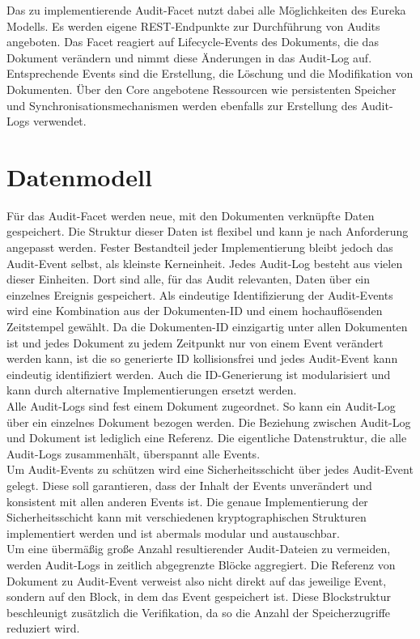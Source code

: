 Das zu implementierende Audit-Facet nutzt dabei alle Möglichkeiten des Eureka Modells. Es werden eigene \acs{REST}-Endpunkte zur Durchführung von Audits angeboten. Das Facet reagiert auf Lifecycle-Events des Dokuments, die das Dokument verändern und nimmt diese Änderungen in das Audit-Log auf. Entsprechende Events sind die Erstellung, die Löschung und die Modifikation von Dokumenten. Über den Core angebotene Ressourcen wie persistenten Speicher und Synchronisationsmechanismen werden ebenfalls zur Erstellung des Audit-Logs verwendet.

\section{Datenmodell}

Für das Audit-Facet werden neue, mit den Dokumenten verknüpfte Daten gespeichert. Die Struktur dieser Daten ist flexibel und kann je nach Anforderung angepasst werden. Fester Bestandteil jeder Implementierung bleibt jedoch das Audit-Event selbst, als kleinste Kerneinheit. Jedes Audit-Log besteht aus vielen dieser Einheiten. Dort sind alle, für das Audit relevanten, Daten über ein einzelnes Ereignis gespeichert. Als eindeutige Identifizierung der Audit-Events wird eine Kombination aus der Dokumenten-ID und einem hochauflösenden Zeitstempel gewählt. Da die Dokumenten-ID einzigartig unter allen Dokumenten ist und jedes Dokument zu jedem Zeitpunkt nur von einem Event verändert werden kann, ist die so generierte ID kollisionsfrei und jedes Audit-Event kann eindeutig identifiziert werden. Auch die ID-Generierung ist modularisiert und kann durch alternative Implementierungen ersetzt werden.\\
Alle Audit-Logs sind fest einem Dokument zugeordnet. So kann ein Audit-Log über ein einzelnes Dokument bezogen werden. Die Beziehung zwischen Audit-Log und Dokument ist lediglich eine Referenz. Die eigentliche Datenstruktur, die alle Audit-Logs zusammenhält, überspannt alle Events.\\
Um Audit-Events zu schützen wird eine Sicherheitsschicht über jedes Audit-Event gelegt. Diese soll garantieren, dass der Inhalt der Events unverändert und konsistent mit allen anderen Events ist. Die genaue Implementierung der Sicherheitsschicht kann mit verschiedenen kryptographischen Strukturen implementiert werden und ist abermals modular und austauschbar.\\
Um eine übermäßig große Anzahl resultierender Audit-Dateien zu vermeiden, werden Audit-Logs in zeitlich abgegrenzte Blöcke aggregiert. Die Referenz von Dokument zu Audit-Event verweist also nicht direkt auf das jeweilige Event, sondern auf den Block, in dem das Event gespeichert ist. Diese Blockstruktur beschleunigt zusätzlich die Verifikation, da so die Anzahl der Speicherzugriffe reduziert wird.

